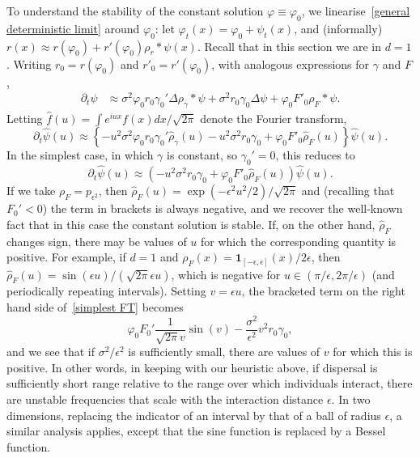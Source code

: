 \documentclass[EJP]{ejpecp} %
\renewcommand{\hat}{\widehat}
\newcommand{\kernel}{\rho}  %
\newcommand{\smooth}[1]{\kernel_{#1} \! * \!}  %
\begin{document}
To understand the stability of the constant solution $\varphi\equiv\varphi_0$, 
we linearise~\eqref{general deterministic limit} around $\varphi_0$:
let $\varphi_t(x) = \varphi_0 + \psi_t(x)$,
and (informally) $r(x) \approx r(\varphi_0) + r'(\varphi_0) \smooth{r} \psi(x)$.
Recall that in this section we are in $d=1$.
Writing $r_0 = r(\varphi_0)$ and $r'_0 = r'(\varphi_0)$,
with analogous expressions for $\gamma$ and $F$,
\begin{align*}
    \partial_t \psi
    &\approx
    \sigma^2 \varphi_0 r_0 \gamma_0' \Delta \smooth{\gamma} \psi
    + \sigma^2 r_0 \gamma_0 \Delta \psi
    + \varphi_0 F'_0 \smooth{F} \psi .
\end{align*}
Letting $\hat f(u) = \int e^{i u x} f(x) dx / \sqrt{2 \pi}$ denote the Fourier transform,
\begin{equation}
	\label{fourier transform psi}
    \partial_t \hat \psi(u)
    \approx
	\left\{
	- u^2\sigma^2 \varphi_0 r_0 \gamma_0' \hat{\rho}_\gamma(u) 
        - u^2 \sigma^2 r_0 \gamma_0
	+ \varphi_0 F'_0 \hat{\rho}_F(u) 
	\right\} \hat \psi(u) .
\end{equation}
In the simplest case, in which $\gamma$ is constant, so $\gamma_0'=0$,
this reduces to
\begin{equation} %
	\label{simplest FT}
	\partial_t \hat \psi(u)
    \approx
    \left(
        - u^2 \sigma^2 r_0 \gamma_0
	+ \varphi_0 F'_0 \hat{\rho}_F(u) 
    \right) \hat \psi(u) .
\end{equation} %
If we take $\rho_F=p_{\epsilon^2}$, then 
$\hat{\rho}_F(u)=\exp(-\epsilon^2 u^2 / 2) / \sqrt{2 \pi}$ and (recalling 
that $F_0'<0$) the term in brackets is always negative, and we recover
the well-known fact that in this case the constant solution is stable.
If, on the other hand, $\hat{\rho}_F$ changes sign, there may be values of $u$ for which the corresponding quantity is positive. For example, if $d=1$ and
$\rho_F(x)={\mathbf 1}_{[-\epsilon, \epsilon]}(x)/2\epsilon$, then 
$\hat{\rho}_F(u)=\sin(\epsilon u)/(\sqrt{2\pi}\epsilon u)$, which is 
negative for $u\in (\pi/\epsilon, 2\pi/\epsilon)$ (and periodically 
repeating intervals). Setting $v=\epsilon u$, the bracketed term on 
the right hand side of~\eqref{simplest FT} becomes 
\[
    \varphi_0F_0'\frac{1}{\sqrt{2\pi} v} \sin(v)
	-\frac{\sigma^2}{\epsilon^2}v^2r_0\gamma_0,
\]
and we see that if $\sigma^2/\epsilon^2$ is sufficiently small, there are
values of $v$ for which this is positive. In other words, in keeping
with our heuristic above, if dispersal is sufficiently short range relative to
the range over which individuals interact, there are unstable frequencies that
scale with the interaction distance $\epsilon$. In two dimensions, replacing 
the indicator of an interval by that of a ball of radius $\epsilon$, a
similar analysis applies, except that the sine function is replaced by a 
Bessel function.
\end{document}
